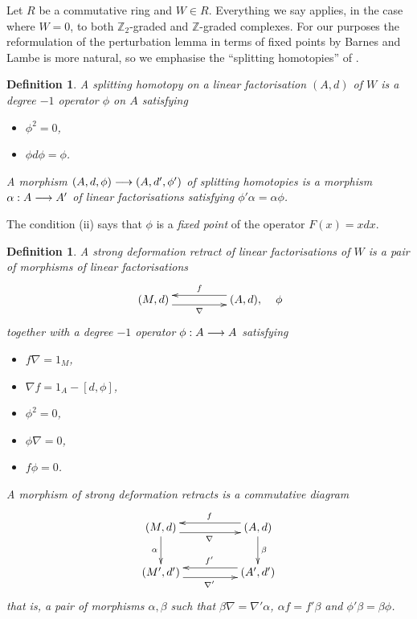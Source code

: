 \documentclass[english,letter paper,12pt,leqno]{article}
\theoremstyle{example}
\newtheorem{definition}[theorem]{Definition}
\numberwithin{equation}{section}
\begin{document}
Let $R$ be a commutative ring and $W \in R$. Everything we say applies, in the case where $W = 0$, to both $\mathbb{Z}_2$-graded and $\mathbb{Z}$-graded complexes.  For our purposes the reformulation of the perturbation lemma in terms of fixed points by Barnes and Lambe is more natural, so we emphasise the ``splitting homotopies'' of \cite{barneslambe}.

\begin{definition} A \emph{splitting homotopy} on a linear factorisation $(A,d)$ of $W$ is a degree $-1$ operator $\phi$ on $A$ satisfying
\begin{itemize}
\item[(i)] $\phi^2 = 0$,
\item[(ii)] $\phi d \phi = \phi$.
\end{itemize}
A \emph{morphism} $(A,d, \phi) \longrightarrow (A,d',\phi')$ of splitting homotopies is a morphism $\alpha: A \longrightarrow A'$ of linear factorisations satisfying $\phi' \alpha = \alpha \phi$.
\end{definition}

The condition (ii) says that $\phi$ is a \emph{fixed point} of the operator $F(x) = x d x$.

\begin{definition} A \emph{strong deformation retract} of linear factorisations of $W$ is a pair of morphisms of linear factorisations
\begin{equation}\label{eq:defn_sdr}
\xymatrix@C+2pc{
(M,d) \ar@<-1ex>[r]_\nabla & (A,d), \ar@<-1ex>[l]_f
} \quad \phi
\end{equation}
together with a degree $-1$ operator $\phi: A \longrightarrow A$ satisfying
\begin{itemize}
\item[(i)] $f \nabla = 1_M$,
\item[(ii)] $\nabla f = 1_A - [d, \phi]$,
\item[(iii)] $\phi^2 = 0$,
\item[(iv)] $\phi \nabla = 0$,
\item[(v)] $f \phi = 0$.
\end{itemize}
A \emph{morphism} of strong deformation retracts is a commutative diagram
\[
\xymatrix@C+2pc{
(M,d) \ar[d]_{\alpha} \ar@<-1ex>[r]_\nabla & (A,d)\ar[d]^\beta \ar@<-1ex>[l]_f\\
(M',d') \ar@<-1ex>[r]_{\nabla'} & (A',d') \ar@<-1ex>[l]_{f'}
}
\]
that is, a pair of morphisms $\alpha, \beta$ such that $\beta \nabla = \nabla' \alpha$, $\alpha f = f' \beta$ and $\phi' \beta = \beta \phi$.
\end{definition}
\end{document}
